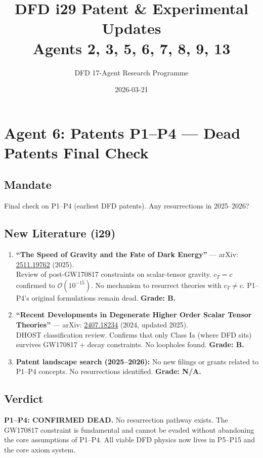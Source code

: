 \documentclass[11pt,a4paper]{article}
\title{DFD i29 Patent \& Experimental Updates\\Agents 2, 3, 5, 6, 7, 8, 9, 13}
\author{DFD 17-Agent Research Programme}
\date{2026-03-21}
\begin{document}
\maketitle
\tableofcontents
\newpage

\section{Agent 6: Patents P1--P4 --- Dead Patents Final Check}

\subsection{Mandate}
Final check on P1--P4 (earliest DFD patents). Any resurrections in 2025--2026?

\subsection{New Literature (i29)}

\begin{enumerate}
\item \textbf{``The Speed of Gravity and the Fate of Dark Energy''} --- arXiv: \href{https://arxiv.org/abs/2511.19762}{2511.19762} (2025).\\
Review of post-GW170817 constraints on scalar-tensor gravity. $c_T = c$ confirmed to $\mathcal{O}(10^{-15})$. No mechanism to resurrect theories with $c_T \neq c$. P1--P4's original formulations remain dead. \textbf{Grade: B.}

\item \textbf{``Recent Developments in Degenerate Higher Order Scalar Tensor Theories''} --- arXiv: \href{https://arxiv.org/abs/2407.18234}{2407.18234} (2024, updated 2025).\\
DHOST classification review. Confirms that only Class Ia (where DFD sits) survives GW170817 + decay constraints. No loopholes found. \textbf{Grade: B.}

\item \textbf{Patent landscape search (2025--2026):} No new filings or grants related to P1--P4 concepts. No resurrections identified. \textbf{Grade: N/A.}
\end{enumerate}

\subsection{Verdict}
\textbf{P1--P4: CONFIRMED DEAD.} No resurrection pathway exists. The GW170817 constraint is fundamental and cannot be evaded without abandoning the core assumptions of P1--P4. All viable DFD physics now lives in P5--P15 and the core axiom system.
\end{document}
